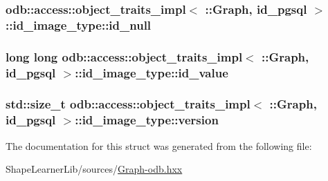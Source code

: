 \subsubsection[{id\+\_\+null}]{ odb\+::access\+::object\+\_\+traits\+\_\+impl$<$ \+::{\bf Graph}, id\+\_\+pgsql $>$\+::id\+\_\+image\+\_\+type\+::id\+\_\+null}\label{structodb_1_1access_1_1object__traits__impl_3_01_1_1_graph_00_01id__pgsql_01_4_1_1id__image__type_ad9bdae837dd5163a09a544958ae63dd0}
\hypertarget{structodb_1_1access_1_1object__traits__impl_3_01_1_1_graph_00_01id__pgsql_01_4_1_1id__image__type_ab0ca98f5c65daee4a2bc135a4f05ecc3}{}
\subsubsection[{id\+\_\+value}]{\setlength{\rightskip}{0pt plus 5cm}long long odb\+::access\+::object\+\_\+traits\+\_\+impl$<$ \+::{\bf Graph}, id\+\_\+pgsql $>$\+::id\+\_\+image\+\_\+type\+::id\+\_\+value}\label{structodb_1_1access_1_1object__traits__impl_3_01_1_1_graph_00_01id__pgsql_01_4_1_1id__image__type_ab0ca98f5c65daee4a2bc135a4f05ecc3}
\hypertarget{structodb_1_1access_1_1object__traits__impl_3_01_1_1_graph_00_01id__pgsql_01_4_1_1id__image__type_ad3512ef6b8dff321c164c322f94c795b}{}
\subsubsection[{version}]{\setlength{\rightskip}{0pt plus 5cm}std\+::size\+\_\+t odb\+::access\+::object\+\_\+traits\+\_\+impl$<$ \+::{\bf Graph}, id\+\_\+pgsql $>$\+::id\+\_\+image\+\_\+type\+::version}\label{structodb_1_1access_1_1object__traits__impl_3_01_1_1_graph_00_01id__pgsql_01_4_1_1id__image__type_ad3512ef6b8dff321c164c322f94c795b}


The documentation for this struct was generated from the following file\+:\begin{DoxyCompactItemize}
\item 
Shape\+Learner\+Lib/sources/\hyperlink{_graph-odb_8hxx}{Graph-\/odb.\+hxx}\end{DoxyCompactItemize}
